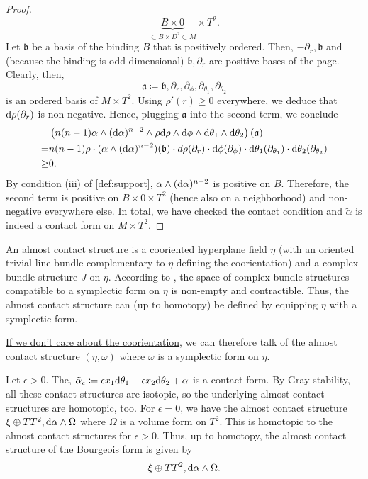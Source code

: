 \begin{proof}
    \[
        \underbrace{B \times 0}_{\subset B \times D^2 \subset M} \times T^2.
    \]
    Let $\mathfrak{b}$ be a basis of the binding $B$ that is positively ordered. Then, $- \partial_r, \mathfrak{b}$ and (because the binding is odd-dimensional) $\mathfrak{b}, \partial_r$ are positive bases of the page. Clearly, then, 
    \[ 
        \mathfrak{a} \coloneqq \mathfrak{b}, \partial_r, \partial_\phi, \partial_{\theta_1}, \partial_{\theta_2}
    \] 
    is an ordered basis of $M\times T^2$.
    Using $\rho'(r) \geq 0$ everywhere, we deduce that $\mathrm{d} \rho(\partial_r)$ is non-negative.
    Hence, plugging $\mathfrak{a}$ into the second term, we conclude
    \begin{align*}
        &\left(n(n-1)\alpha \wedge (\mathrm{d} \alpha)^{n-2}\wedge \rho \mathrm{d}\rho \wedge \mathrm{d} \phi \wedge \mathrm{d} \theta_1 \wedge \mathrm{d} \theta_2\right)(\mathfrak{a})\\
        =& n(n-1) \rho \cdot (\alpha \wedge (\mathrm{d} \alpha)^{n-2})(\mathfrak{b}) \cdot d\rho(\partial_r) \cdot \mathrm{d} \phi(\partial_\phi) \cdot \mathrm{d} \theta_1(\partial_{\theta_1}) \cdot \mathrm{d} \theta_2(\partial_{\theta_2})\\
        \geq& 0.
    \end{align*}
    By condition (iii) of \cref{def:support}, $\alpha \wedge (\mathrm{d} \alpha)^{n-2}$ is positive on $B$. Therefore, the second term is positive on $B \times 0 \times T^2$ (hence also on a neighborhood) and non-negative everywhere else.
    In total, we have checked the contact condition and $\tilde \alpha$ is indeed a contact form on $M\times T^2$.
\end{proof}
\begin{definition}
    An almost contact structure is a cooriented hyperplane field $\eta$ (with an oriented trivial line bundle complementary to $\eta$ defining the coorientation) and a complex bundle structure $J$ on $\eta$.
    According to \cite[Prop 2.4.5]{Geiges08}, the space of complex bundle structures compatible to a symplectic form on $\eta$ is non-empty and contractible. Thus, the almost contact structure can (up to homotopy) be defined by equipping $\eta$ with a symplectic form.

    \underline{If we don't care about the coorientation}, we can therefore talk of the almost contact structure $(\eta, \omega)$ where $\omega$ is a symplectic form on $\eta$.
\end{definition}
\begin{remark}
    Let $\epsilon > 0$. The, $\tilde \alpha_\epsilon \coloneqq \epsilon x_1 \mathrm{d} \theta_1 - \epsilon x_2 \mathrm{d} \theta_2 + \alpha$ is a contact form.
    By Gray stability, all these contact structures are isotopic, so the underlying almost contact structures are homotopic, too. 
    For $\epsilon = 0$, we have the almost contact structure $\xi \oplus TT^2, \mathrm{d} \alpha \wedge \Omega$ where $\Omega$ is a volume form on $T^2$.
    This is homotopic to the almost contact structures for $\epsilon > 0$.
    Thus, up to homotopy, the almost contact structure of the Bourgeois form is given by 
    \[
        \xi \oplus TT^2, \mathrm{d} \alpha \wedge \Omega.
    \]
\end{remark}